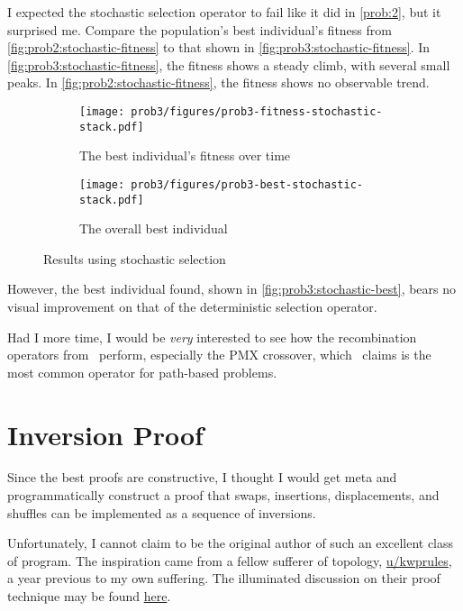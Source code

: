 \documentclass{article}
\begin{document}
I expected the stochastic selection operator to fail like it did in \autoref{prob:2}, but it
surprised me. Compare the population's best individual's fitness from
\autoref{fig:prob2:stochastic-fitness} to that shown in \autoref{fig:prob3:stochastic-fitness}. In
\autoref{fig:prob3:stochastic-fitness}, the fitness shows a steady climb, with several small peaks.
In \autoref{fig:prob2:stochastic-fitness}, the fitness shows no observable trend.

\begin{figure}[h]
    \centering
    \begin{subfigure}[b]{0.45\textwidth}
        \texttt{[image: prob3/figures/prob3-fitness-stochastic-stack.pdf]}
        \caption{The best individual's fitness over time}\label{fig:prob3:stochastic-fitness}
    \end{subfigure}
    \begin{subfigure}[b]{0.45\textwidth}
        \texttt{[image: prob3/figures/prob3-best-stochastic-stack.pdf]}
        \caption{The overall best individual}\label{fig:prob3:stochastic-best}
    \end{subfigure}
    \caption{Results using stochastic selection}\label{fig:prob3:stochastic-results}
\end{figure}

However, the best individual found, shown in \autoref{fig:prob3:stochastic-best}, bears no visual
improvement on that of the deterministic selection operator.

Had I more time, I would be \textit{very} interested to see how the recombination operators
from~\cite{tsp_ea} perform, especially the PMX crossover, which~\cite{tsp_ea} claims is the most
common operator for path-based problems.

\appendix\appendixpage{}\addappheadtotoc{}
\section{Inversion Proof}\label{app:proof}

Since the best proofs are constructive, I thought I would get meta and programmatically construct a
proof that swaps, insertions, displacements, and shuffles can be implemented as a sequence of
inversions.

Unfortunately, I cannot claim to be the original author of such an excellent class of program. The
inspiration came from a fellow sufferer of topology,
\href{https://www.reddit.com/user/kwprules}{u/kwprules}, a year previous to my own suffering. The
illuminated discussion on their proof technique may be found
\href{https://www.reddit.com/r/math/comments/7gqhlc/what\_to\_say\_instead\_of\_trivially/}{here}.

\inputminted{python}{proof.py}


{}
\end{document}
